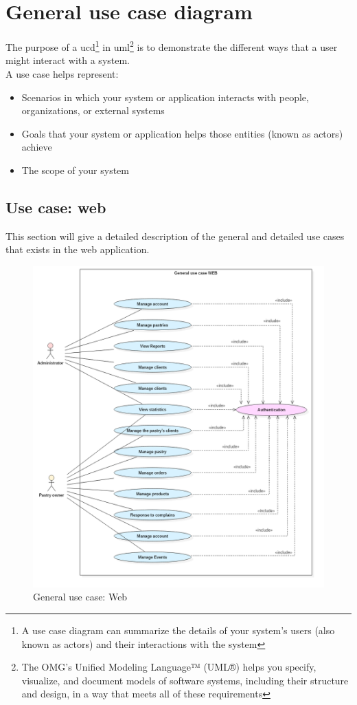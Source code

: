 \documentclass[12pt,a4paper]{report}
\begin{document}
	\section{General use case diagram}
	The purpose of a \ac{ucd}\footnote{A use case diagram can summarize the details of your system's users (also known as actors) and their interactions with the system} in \ac{uml}\footnote{The OMG's Unified Modeling Language™ (UML®) helps you specify, visualize, and document models of software systems, including their structure and design, in a way that meets all of these requirements} is to demonstrate the different ways that a user might interact with a system.\\
	A use case helps represent: 
	
	\begin{itemize}
		\item 	Scenarios in which your system or application interacts with people, organizations, or external systems
		\item 	Goals that your system or application helps those entities (known as actors) achieve
		\item  	The scope of your system
	\end{itemize}
	
	\subsection{Use case: web}
	This section will give a detailed description of the general and detailed use cases that exists in the web application.
	\begin{figure}[H]
		\vspace*{1cm}
		
		\centering
		\includegraphics[width=7in,keepaspectratio]{usecaseWeb.png}
		\caption{General use case: Web}
		\label{user-case-web}
	\end{figure}
	
\end{document}
